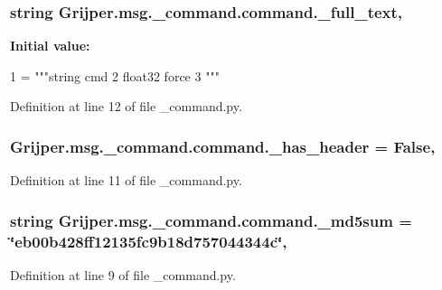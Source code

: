 \subsubsection[{\-\_\-full\-\_\-text}]{\setlength{\rightskip}{0pt plus 5cm}string Grijper.\-msg.\-\_\-command.\-command.\-\_\-full\-\_\-text\hspace{0.3cm}{\ttfamily [static]}, {\ttfamily [private]}}\label{classGrijper_1_1msg_1_1__command_1_1command_adb5483b2c9d0a6c9adc1f4967b11c12a}
{\bfseries Initial value\-:}
\begin{DoxyCode}
1 = \textcolor{stringliteral}{"""string cmd}
2 \textcolor{stringliteral}{float32 force}
3 \textcolor{stringliteral}{"""}
\end{DoxyCode}


Definition at line 12 of file \-\_\-command.\-py.

\subsubsection[{\-\_\-has\-\_\-header}]{\setlength{\rightskip}{0pt plus 5cm}Grijper.\-msg.\-\_\-command.\-command.\-\_\-has\-\_\-header = False\hspace{0.3cm}{\ttfamily [static]}, {\ttfamily [private]}}\label{classGrijper_1_1msg_1_1__command_1_1command_a4bef649896d3f260120dd2597e050dc4}


Definition at line 11 of file \-\_\-command.\-py.

\subsubsection[{\-\_\-md5sum}]{\setlength{\rightskip}{0pt plus 5cm}string Grijper.\-msg.\-\_\-command.\-command.\-\_\-md5sum = \char`\"{}eb00b428ff12135fc9b18d757044344c\char`\"{}\hspace{0.3cm}{\ttfamily [static]}, {\ttfamily [private]}}\label{classGrijper_1_1msg_1_1__command_1_1command_afa10d063a485653bf84cf744093c728d}


Definition at line 9 of file \-\_\-command.\-py.

